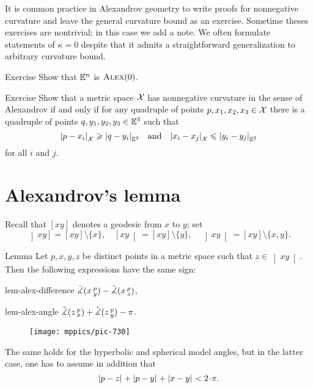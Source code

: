 It is common practice in Alexandrov geometry to write proofs for nonnegative curvature and 
leave the general curvature bound as an exercise.
Sometime theses exercises are nontrivial;
in this case we add a note.
We often formulate statements of $\kappa=0$ despite that it admits a straightforward generalization to arbitrary curvature bound.


\begin{thm}{Exercise}\label{ex:Euclid-is-CBB}
Show that $\mathbb{E}^n$ is $\textsc{Alex}(0)$.
\end{thm}

\begin{thm}{Exercise}\label{ex:(3+1)-expanding}
Show that a metric space $\mathcal{X}$ has nonnegative curvature in the sense of Alexandrov
if and only if for any quadruple of points $p,x_1,x_2,x_3\in \mathcal{X}$ 
there is a quadruple of points $q,y_1,y_2,y_3\in\mathbb{E}^3$
such that 
\[|{p}-{x_i}|_{\mathcal{X}}^{{}}\geqslant|{q}-{y_i}|_{\mathbb{E}^2}^{{}} 
\quad \text{and}\quad
|{x_i}-{x_j}|_{\mathcal{X}}^{{}}\leqslant|{y_i}-{y_j}|_{\mathbb{E}^2}^{{}}\] 
for all $i$ and $j$.
\end{thm}

\section{Alexandrov's lemma}

Recall that $[xy]$ denotes a geodesic from $x$ to $y$;
set  
\index{$\left]x y\right]$, $\left[x y\right[$, $\left]x y\right[$}
\[
\left]x y\right]=[xy]\setminus\{x\},
\quad
\left[x y\right[=[xy]\setminus\{y\},
\quad
\left]x y\right[=[xy]\setminus\{x,y\}.\]

\begin{thm}{Lemma}
\label{lem:alex}  
Let $p,x,y,z$ be distinct points in a metric space such that $z\in \left]x y\right[$.
Then 
the following expressions have the same sign:

\begin{subthm}{lem-alex-difference}
$\tilde\measuredangle(x\,{}^{p}_{y})
-\tilde\measuredangle(x\,{}^{p}_{z})$,
\end{subthm} 

\begin{subthm}{lem-alex-angle}
$\tilde\measuredangle(z\,{}^{p}_{x})
+\tilde\measuredangle(z\,{}^{p}_{y}) -\pi$.
\end{subthm}

\begin{wrapfigure}{r}{25mm}
\vskip-6mm
\centering
\texttt{[image: mppics/pic-730]}
\end{wrapfigure}

The same holds for the hyperbolic and spherical model angles, 
but in the latter case, one has to assume in addition that
\[\dist{p}{z}{}+\dist{p}{y}{}+\dist{x}{y}{}< 2\cdot\pi.\]

\end{thm}

